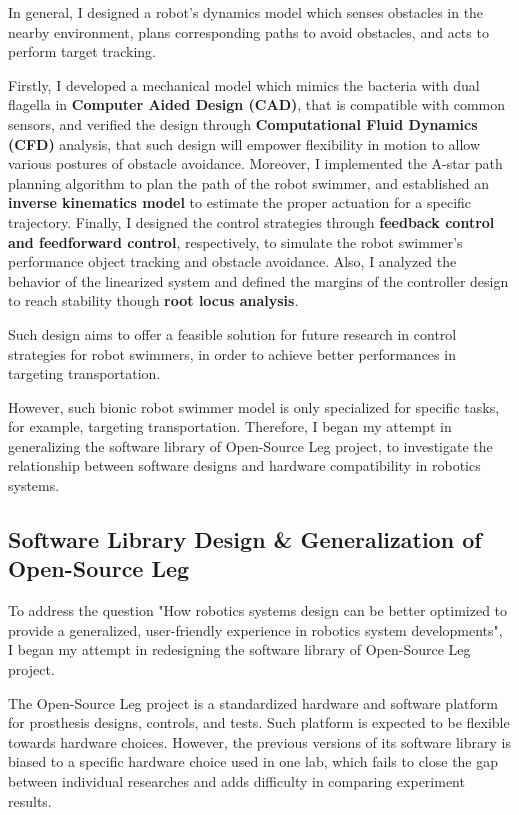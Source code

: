\documentclass[8pt]{article}
\begin{document}
    In general, I designed a robot's dynamics model which senses obstacles in the nearby environment, plans corresponding paths to avoid obstacles, and acts to perform target tracking. 

    Firstly, I developed a mechanical model which mimics the bacteria with dual flagella in \textbf{Computer Aided Design (CAD)}, that is compatible with common sensors, and verified the design through \textbf{Computational Fluid Dynamics (CFD)} analysis, that such design will empower flexibility in motion to allow various postures of obstacle avoidance. Moreover, I implemented the A-star\cite{AstarAlgo} path planning algorithm to plan the path of the robot swimmer, and established an \textbf{inverse kinematics model} to estimate the proper actuation for a specific trajectory. Finally, I designed the control strategies through \textbf{feedback control and feedforward control}, respectively, to simulate the robot swimmer's performance object tracking and obstacle avoidance. Also, I analyzed the behavior of the linearized system and defined the margins of the controller design to reach stability though \textbf{root locus analysis}\cite{RootLocus}.

    Such design aims to offer a feasible solution for future research in control strategies for robot swimmers, in order to achieve better performances in targeting transportation. 
    
    However, such bionic robot swimmer model is only specialized for specific tasks, for example, targeting transportation. Therefore, I began my attempt in generalizing the software library of Open-Source Leg project, to investigate the relationship between software designs and hardware compatibility in robotics systems.

    \subsection{Software Library Design \& Generalization of Open-Source Leg}   \label{sec:OSL-Library}

    To address the question "How robotics systems design can be better optimized to provide a generalized, user-friendly experience in robotics system developments", I began my attempt in redesigning the software library of Open-Source Leg project.
    
    The Open-Source Leg project is a standardized hardware and software platform for prosthesis designs, controls, and tests. Such platform is expected to be flexible towards hardware choices. However, the previous versions of its software library is biased to a specific hardware choice used in one lab, which fails to close the gap between individual researches and adds difficulty in comparing experiment results. 
\end{document}
